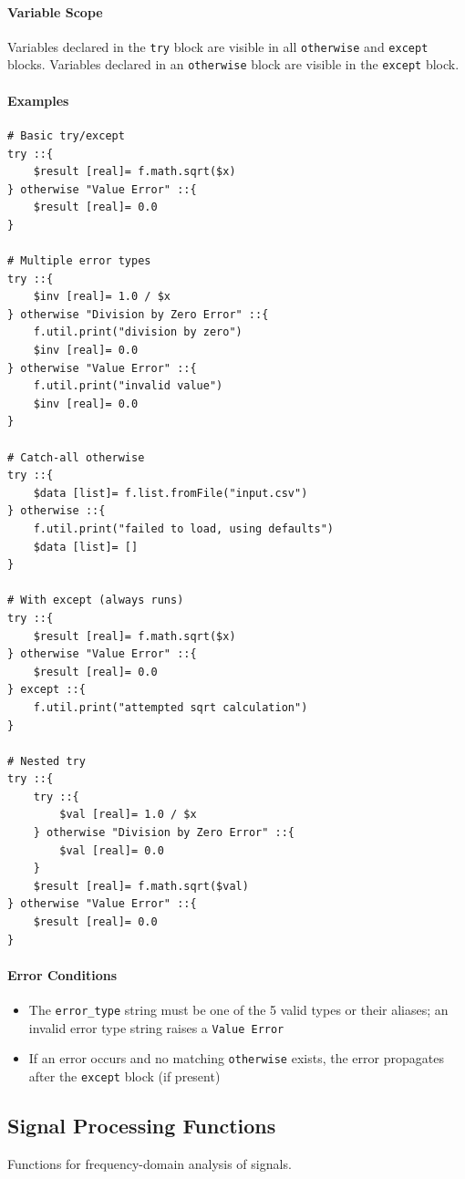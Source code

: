 \paragraph{Variable Scope}
Variables declared in the \texttt{try} block are visible in all \texttt{otherwise} and \texttt{except} blocks. Variables declared in an \texttt{otherwise} block are visible in the \texttt{except} block.

\paragraph{Examples}
\begin{verbatim}
# Basic try/except
try ::{
    $result [real]= f.math.sqrt($x)
} otherwise "Value Error" ::{
    $result [real]= 0.0
}

# Multiple error types
try ::{
    $inv [real]= 1.0 / $x
} otherwise "Division by Zero Error" ::{
    f.util.print("division by zero")
    $inv [real]= 0.0
} otherwise "Value Error" ::{
    f.util.print("invalid value")
    $inv [real]= 0.0
}

# Catch-all otherwise
try ::{
    $data [list]= f.list.fromFile("input.csv")
} otherwise ::{
    f.util.print("failed to load, using defaults")
    $data [list]= []
}

# With except (always runs)
try ::{
    $result [real]= f.math.sqrt($x)
} otherwise "Value Error" ::{
    $result [real]= 0.0
} except ::{
    f.util.print("attempted sqrt calculation")
}

# Nested try
try ::{
    try ::{
        $val [real]= 1.0 / $x
    } otherwise "Division by Zero Error" ::{
        $val [real]= 0.0
    }
    $result [real]= f.math.sqrt($val)
} otherwise "Value Error" ::{
    $result [real]= 0.0
}
\end{verbatim}

\paragraph{Error Conditions}
\begin{itemize}
\item The \texttt{error\_type} string must be one of the 5 valid types or their aliases; an invalid error type string raises a \texttt{Value Error}
\item If an error occurs and no matching \texttt{otherwise} exists, the error propagates after the \texttt{except} block (if present)
\end{itemize}

\subsection{Signal Processing Functions}
Functions for frequency-domain analysis of signals.


